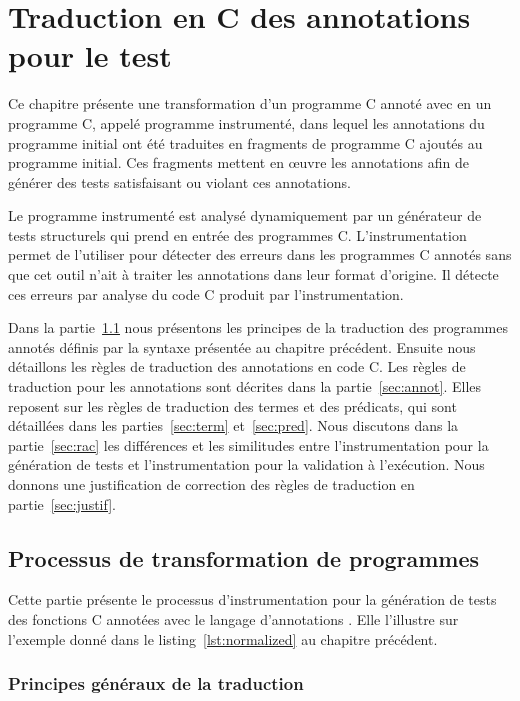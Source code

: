 
\chapter{Traduction en C des annotations pour le test}
\label{sec:traduction}

\chapterintro

Ce chapitre présente une transformation d'un programme C annoté avec \eacsl en
un programme C, appelé programme instrumenté, dans lequel les annotations
\eacsl du programme initial ont été traduites en fragments de programme C
ajoutés au programme initial.
Ces fragments mettent en \oe{}uvre les annotations \eacsl afin de générer des
tests satisfaisant ou violant ces annotations.

Le programme instrumenté est analysé dynamiquement par un générateur de tests
structurels qui prend en entrée des programmes C.
L'instrumentation permet de l'utiliser pour détecter des erreurs dans les
programmes C annotés sans que cet outil n'ait à traiter les annotations dans
leur format d'origine.
Il détecte ces erreurs par analyse du code C produit par l'instrumentation.

Dans la partie~\ref{sec:process} nous présentons les principes de la traduction
des programmes annotés définis par la syntaxe présentée au chapitre précédent.
Ensuite nous détaillons les règles de traduction des annotations \eacsl en code
C.
Les règles de traduction pour les annotations sont décrites dans la
partie~\ref{sec:annot}.
Elles reposent sur les règles de traduction des termes et des prédicats, qui
sont détaillées dans les parties~\ref{sec:term} et~\ref{sec:pred}.
Nous discutons dans la partie~\ref{sec:rac} les différences et les
similitudes entre l'instrumentation pour la génération de tests et
l'instrumentation pour la validation à l'exécution.
Nous donnons une justification de correction des règles de traduction en
partie~\ref{sec:justif}.


\section{Processus de transformation de programmes}
\label{sec:process}


Cette partie présente le processus d'instrumentation pour la génération de tests
des fonctions C annotées avec le langage d'annotations \eacsl.
Elle l'illustre sur l'exemple donné dans le listing~\ref{lst:normalized} au
chapitre précédent.


\subsection{Principes généraux de la traduction}
\label{sec:principles}


